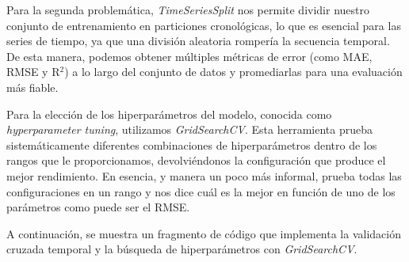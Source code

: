 Para la segunda problemática, \textit{TimeSeriesSplit} nos permite dividir nuestro conjunto de entrenamiento en particiones cronológicas, lo que es esencial para las series de tiempo, ya que una división aleatoria rompería la secuencia temporal. De esta manera, podemos obtener múltiples métricas de error (como MAE, RMSE y R$^2$) a lo largo del conjunto de datos y promediarlas para una evaluación más fiable.

Para la elección de los hiperparámetros del modelo, conocida como \textit{hyperparameter tuning}, utilizamos \textit{GridSearchCV}. Esta herramienta prueba sistemáticamente diferentes combinaciones de hiperparámetros dentro de los rangos que le proporcionamos, devolviéndonos la configuración que produce el mejor rendimiento. En esencia, y manera un poco más informal, prueba todas las configuraciones en un rango y nos dice cuál es la mejor en función de uno de los parámetros como puede ser el RMSE.

A continuación, se muestra un fragmento de código que implementa la validación cruzada temporal y la búsqueda de hiperparámetros con \textit{GridSearchCV}.

